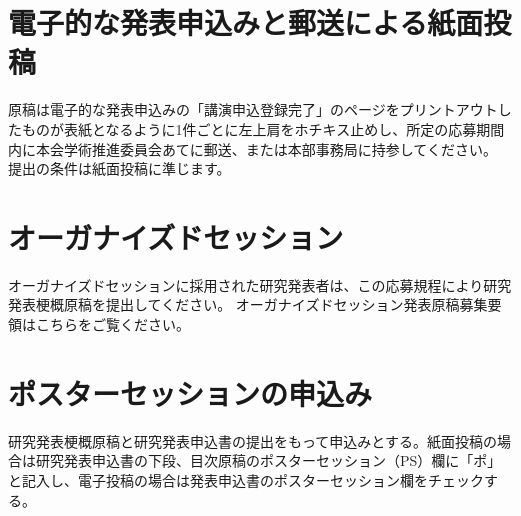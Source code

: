 \documentclass[base=10pt,magstyle=real,a4paper,twocolumn,xelatex,pandoc,jafont=ms]{bxjsarticle}
\begin{document}
\section{電子的な発表申込みと郵送による紙面投稿}
原稿は電子的な発表申込みの「講演申込登録完了」のページをプリントアウトしたものが表紙となるように1件ごとに左上肩をホチキス止めし、所定の応募期間内に本会学術推進委員会あてに郵送、または本部事務局に持参してください。
提出の条件は紙面投稿に準じます。

\section{オーガナイズドセッション}
オーガナイズドセッションに採用された研究発表者は、この応募規程により研究発表梗概原稿を提出してください。
オーガナイズドセッション発表原稿募集要領はこちらをご覧ください。

\section{ポスターセッションの申込み}
研究発表梗概原稿と研究発表申込書の提出をもって申込みとする。紙面投稿の場合は研究発表申込書の下段、目次原稿のポスターセッション（PS）欄に「ポ」と記入し、電子投稿の場合は発表申込書のポスターセッション欄をチェックする。


\makeaffiliation
\end{document}
